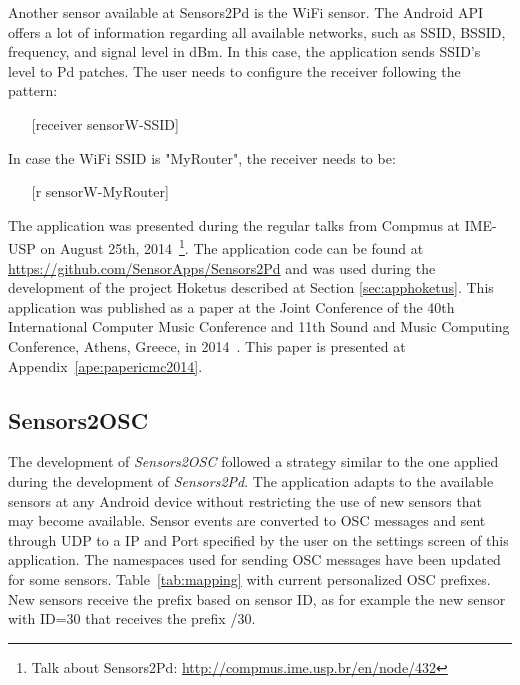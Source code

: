 Another sensor available at Sensors2Pd is the WiFi sensor.
The Android API offers a lot of information regarding all available networks, such as SSID, BSSID, frequency, and signal level in dBm.
In this case, the application sends SSID's level to Pd patches.
The user needs to configure the receiver following the pattern:

\begin{itemize}\itemsep0em
\item[]    [receiver sensorW-{SSID}]
\end{itemize}

In case the WiFi SSID is "MyRouter", the receiver needs to be:

\begin{itemize}\itemsep0em
\item[]    [r sensorW-MyRouter]
\end{itemize}

The application was presented during the regular talks from Compmus at IME-USP on August 25th, 2014~\footnote{Talk about Sensors2Pd: \url{http://compmus.ime.usp.br/en/node/432}}.
The application code can be found at \url{https://github.com/SensorApps/Sensors2Pd} and was used during the development of the project Hoketus described at Section \ref{sec:apphoketus}.
This application was published as a paper at the Joint Conference of the 40th International Computer Music Conference and 11th Sound and Music Computing Conference, Athens, Greece, in 2014~\citep{deCarvalhoJunior2014sensors2pd}.
This paper is presented at Appendix~\ref{ape:papericmc2014}.

\subsection*{Sensors2OSC}
\label{subsec:appsensors2osc}

The development of \textit{Sensors2OSC} followed a strategy similar to the one applied during the development of \textit{Sensors2Pd}.
The application adapts to the available sensors at any Android device without restricting the use of new sensors that may become available.
Sensor events are converted to OSC messages and sent through UDP to a IP and Port specified by the user on the settings screen of this application.
The namespaces used for sending OSC messages have been updated for some sensors.
Table~\ref{tab:mapping} with current personalized OSC prefixes.
New sensors receive the prefix based on sensor ID, as for example the new sensor with ID=30 that receives the prefix /30.

